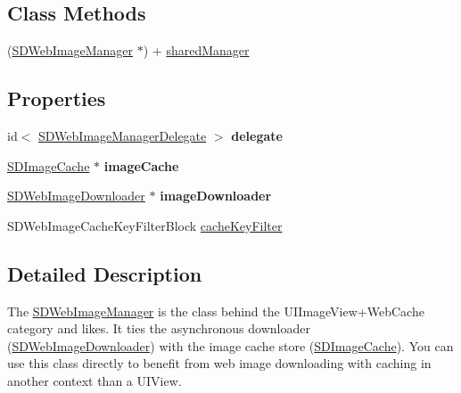 \subsection*{Class Methods}
\begin{DoxyCompactItemize}
\item 
(\hyperlink{interface_s_d_web_image_manager}{S\+D\+Web\+Image\+Manager} $\ast$) + \hyperlink{interface_s_d_web_image_manager_a03e60850e7f6da2aa38b7db870c93626}{shared\+Manager}
\end{DoxyCompactItemize}
\subsection*{Properties}
\begin{DoxyCompactItemize}
\item 
\hypertarget{interface_s_d_web_image_manager_ac631cd586994b3c65d6124c53443c243}{}id$<$ \hyperlink{protocol_s_d_web_image_manager_delegate-p}{S\+D\+Web\+Image\+Manager\+Delegate} $>$ {\bfseries delegate}\label{interface_s_d_web_image_manager_ac631cd586994b3c65d6124c53443c243}

\item 
\hypertarget{interface_s_d_web_image_manager_ac644dd01e0bc3a73d0d12ef544e1d987}{}\hyperlink{interface_s_d_image_cache}{S\+D\+Image\+Cache} $\ast$ {\bfseries image\+Cache}\label{interface_s_d_web_image_manager_ac644dd01e0bc3a73d0d12ef544e1d987}

\item 
\hypertarget{interface_s_d_web_image_manager_af777c49956e24ea8f8fca4cd9780885b}{}\hyperlink{interface_s_d_web_image_downloader}{S\+D\+Web\+Image\+Downloader} $\ast$ {\bfseries image\+Downloader}\label{interface_s_d_web_image_manager_af777c49956e24ea8f8fca4cd9780885b}

\item 
S\+D\+Web\+Image\+Cache\+Key\+Filter\+Block \hyperlink{interface_s_d_web_image_manager_aa95a2fbd9decbe956b7b088075856010}{cache\+Key\+Filter}
\end{DoxyCompactItemize}


\subsection{Detailed Description}
The \hyperlink{interface_s_d_web_image_manager}{S\+D\+Web\+Image\+Manager} is the class behind the U\+I\+Image\+View+\+Web\+Cache category and likes. It ties the asynchronous downloader (\hyperlink{interface_s_d_web_image_downloader}{S\+D\+Web\+Image\+Downloader}) with the image cache store (\hyperlink{interface_s_d_image_cache}{S\+D\+Image\+Cache}). You can use this class directly to benefit from web image downloading with caching in another context than a U\+I\+View.

